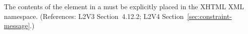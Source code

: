 The contents of the  element in a \Constraint must be
explicitly placed in the XHTML XML namespace.  (References: L2V3
Section~4.12.2; L2V4 Section~\ref{sec:constraint-message}.)
